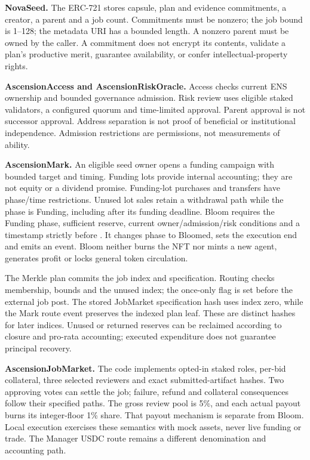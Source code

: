 \textbf{NovaSeed.} The ERC-721 stores capsule, plan and evidence commitments, a creator, a parent and a job count. Commitments must be nonzero; the job bound is 1--128; the metadata URI has a bounded length. A nonzero parent must be owned by the caller. A commitment does not encrypt its contents, validate a plan's productive merit, guarantee availability, or confer intellectual-property rights.

\textbf{AscensionAccess and AscensionRiskOracle.} Access checks current ENS ownership and bounded governance admission. Risk review uses eligible staked validators, a configured quorum and time-limited approval. Parent approval is not successor approval. Address separation is not proof of beneficial or institutional independence. Admission restrictions are permissions, not measurements of ability.

\textbf{AscensionMark.} An eligible seed owner opens a funding campaign with bounded target and timing. Funding lots provide internal accounting; they are not equity or a dividend promise. Funding-lot purchases and transfers have phase/time restrictions. Unused lot sales retain a withdrawal path while the phase is Funding, including after its funding deadline. Bloom requires the Funding phase, sufficient reserve, current owner/admission/risk conditions and a timestamp strictly before . It changes phase to Bloomed, sets the execution end and emits an event. Bloom neither burns the NFT nor mints a new agent, generates profit or locks general token circulation.

The Merkle plan commits the job index and specification. Routing checks membership, bounds and the unused index; the once-only flag is set before the external job post. The stored JobMarket specification hash uses index zero, while the Mark route event preserves the indexed plan leaf. These are distinct hashes for later indices. Unused or returned reserves can be reclaimed according to closure and pro-rata accounting; executed expenditure does not guarantee principal recovery.

\textbf{AscensionJobMarket.} The code implements opted-in staked roles, per-bid collateral, three selected reviewers and exact submitted-artifact hashes. Two approving votes can settle the job; failure, refund and collateral consequences follow their specified paths. The gross review pool is 5\%, and each actual payout burns its integer-floor 1\% share. That payout mechanism is separate from Bloom. Local execution exercises these semantics with mock assets, never live funding or trade. The Manager USDC route remains a different denomination and accounting path.

